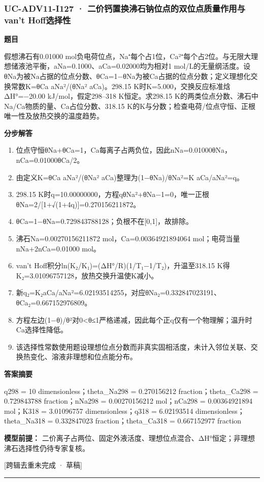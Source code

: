 \documentclass[UTF8,11pt,a4paper]{ctexart}
\begin{document}
\subsubsection*{UC-ADV11-I127 · 二价钙置换沸石钠位点的双位点质量作用与van’t Hoff选择性}
\noindent\textbf{题目}\par
假想沸石有0.01000 mol负电荷位点，Na⁺每个占1位，Ca²⁺每个占2位。与无限大理想储液池平衡，aNa=0.1000、aCa=0.02000均为相对1 mol/L的无量纲活度。设θNa为被Na占据的位点分数、θCa=1−θNa为被Ca占据的位点分数；定义理想化交换常数K=θCa aNa²/(θNa² aCa)。298.15 K时K=5.000，交换反应标准焓ΔH°=−20.00 kJ/mol，假定298–318 K恒定。求298.15 K的两类位点分数、沸石中Na/Ca物质的量、Ca占位分数、318.15 K的K与分数；检查电荷/位点守恒、正根唯一性及放热交换的温度趋势。\par
\medskip\noindent\textbf{分步解答}
\begin{enumerate}
\item 位点守恒θNa+θCa=1，Ca每离子占两负位，因此nNa=0.01000θNa，nCa=0.01000θCa/2。
\item 由定义K=θCa aNa²/(θNa² aCa)整理为(1−θNa)/θNa²=K aCa/aNa²=q。
\item 298.15 K时q=10.00000000，方程qθNa²+θNa−1=0，唯一正根θNa=2/[1+√(1+4q)]=0.270156211872。
\item θCa=1−θNa=0.729843788128；负根不在[0,1]，故排除。
\item 沸石Na=0.00270156211872 mol，Ca=0.00364921894064 mol；电荷当量nNa+2nCa=0.01000 mol。
\item van’t Hoff积分ln(K₂/K₁)=(ΔH°/R)(1/T₁−1/T₂)，升温至318.15 K得K₂=3.01096757128，放热交换升温使K减小。
\item 新q₂=K₂aCa/aNa²=6.02193514255，对应θNa₂=0.332847023191、θCa₂=0.667152976809。
\item 方程左边(1−θ)/θ²对0<θ≤1严格递减，因此每个正q仅有一个物理解；温升时Ca选择性降低。
\item 该选择性常数使用题设理想位点分数而非真实固相活度，未计入邻位关联、交换热变化、溶液非理想和位点能分布。
\end{enumerate}
\noindent\textbf{答案摘要}\par
q298 = 10 dimensionless；theta\_Na298 = 0.270156212 fraction；theta\_Ca298 = 0.729843788 fraction；nNa298 = 0.00270156212 mol；nCa298 = 0.00364921894 mol；K318 = 3.01096757 dimensionless；q318 = 6.02193514 dimensionless；theta\_Na318 = 0.332847023 fraction；theta\_Ca318 = 0.667152977 fraction\par
\noindent\textbf{模型前提：}
二价离子占两位、固定外液活度、理想位点混合、ΔH°恒定；非理想沸石选择性仍待专家复核。\par
\noindent\textcolor{red!65!black}{[跨辑去重未完成 · 草稿]} \par
\medskip\hrule\medskip
{}
\end{document}
